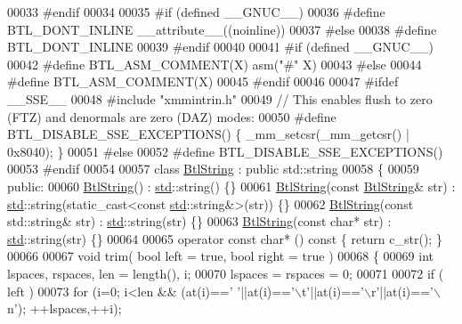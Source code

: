 \begin{DoxyCode}
00033 \textcolor{preprocessor}{#endif}
00034 
00035 \textcolor{preprocessor}{#if (defined \_\_GNUC\_\_)}
00036 \textcolor{preprocessor}{#define BTL\_DONT\_INLINE \_\_attribute\_\_((noinline))}
00037 \textcolor{preprocessor}{#else}
00038 \textcolor{preprocessor}{#define BTL\_DONT\_INLINE}
00039 \textcolor{preprocessor}{#endif}
00040 
00041 \textcolor{preprocessor}{#if (defined \_\_GNUC\_\_)}
00042 \textcolor{preprocessor}{#define BTL\_ASM\_COMMENT(X)  asm("#" X)}
00043 \textcolor{preprocessor}{#else}
00044 \textcolor{preprocessor}{#define BTL\_ASM\_COMMENT(X)}
00045 \textcolor{preprocessor}{#endif}
00046 
00047 \textcolor{preprocessor}{#ifdef \_\_SSE\_\_}
00048 \textcolor{preprocessor}{#include "xmmintrin.h"}
00049 \textcolor{comment}{// This enables flush to zero (FTZ) and denormals are zero (DAZ) modes:}
00050 \textcolor{preprocessor}{#define BTL\_DISABLE\_SSE\_EXCEPTIONS()  \{ \_mm\_setcsr(\_mm\_getcsr() | 0x8040); \}}
00051 \textcolor{preprocessor}{#else}
00052 \textcolor{preprocessor}{#define BTL\_DISABLE\_SSE\_EXCEPTIONS()}
00053 \textcolor{preprocessor}{#endif}
00054 
00057 \textcolor{keyword}{class }\hyperlink{class_btl_string}{BtlString} : \textcolor{keyword}{public} std::string
00058 \{
00059 \textcolor{keyword}{public}:
00060     \hyperlink{class_btl_string}{BtlString}() : \hyperlink{namespacestd}{std}::string() \{\}
00061     \hyperlink{class_btl_string}{BtlString}(\textcolor{keyword}{const} \hyperlink{class_btl_string}{BtlString}& str) : \hyperlink{namespacestd}{std}::string(static\_cast<const 
      \hyperlink{namespacestd}{std}::string&>(str)) \{\}
00062     \hyperlink{class_btl_string}{BtlString}(\textcolor{keyword}{const} std::string& str) : \hyperlink{namespacestd}{std}::string(str) \{\}
00063     \hyperlink{class_btl_string}{BtlString}(\textcolor{keyword}{const} \textcolor{keywordtype}{char}* str) : \hyperlink{namespacestd}{std}::string(str) \{\}
00064 
00065     \textcolor{keyword}{operator} \textcolor{keyword}{const} \textcolor{keywordtype}{char}* () \textcolor{keyword}{const} \{ \textcolor{keywordflow}{return} c\_str(); \}
00066 
00067     \textcolor{keywordtype}{void} trim( \textcolor{keywordtype}{bool} left = \textcolor{keyword}{true}, \textcolor{keywordtype}{bool} right = \textcolor{keyword}{true} )
00068     \{
00069         \textcolor{keywordtype}{int} lspaces, rspaces, len = length(), i;
00070         lspaces = rspaces = 0;
00071 
00072         \textcolor{keywordflow}{if} ( left )
00073             \textcolor{keywordflow}{for} (i=0; i<len && (at(i)==\textcolor{charliteral}{' '}||at(i)==\textcolor{charliteral}{'\(\backslash\)t'}||at(i)==\textcolor{charliteral}{'\(\backslash\)r'}||at(i)==\textcolor{charliteral}{'\(\backslash\)n'}); ++lspaces,++i);

\end{DoxyCode}
